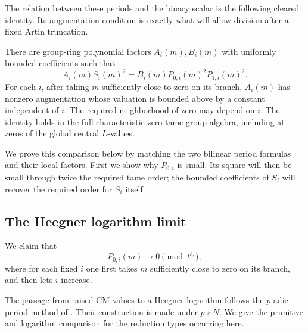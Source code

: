 The relation between these periods and the binary scalar is the
following cleared identity.  Its augmentation condition is exactly
what will allow division after a fixed Artin truncation.

\begin{lemma}
\label{lem:cleared-period-comparison}
There are group-ring polynomial factors $A_i(m),B_i(m)$ with uniformly
bounded coefficients such that
\begin{equation}\label{eq:cleared-period-comparison}
 A_i(m)S_i(m)^2
   =B_i(m)P_{0,i}(m)^2P_{1,i}(m)^2.
\end{equation}
For each $i$, after taking $m$ sufficiently close to zero on its branch,
$A_i(m)$ has nonzero augmentation whose valuation is bounded above by
a constant independent of $i$.  The required neighborhood of zero may
depend on $i$.
The identity holds in the full characteristic-zero tame group algebra,
including at zeros of the global central $L$-values.
\end{lemma}

We prove this comparison below by matching the two bilinear period
formulas and their local factors.  First we show why $P_{0,i}$ is small.
Its square will then be small through twice the required tame order;
the bounded coefficients of $S_i$ will recover the required order for
$S_i$ itself.

\subsection{The Heegner logarithm limit}

We claim that
\begin{equation}\label{eq:toric-period-small}
 P_{0,i}(m)\longrightarrow0\pmod {t^{b_*}},
\end{equation}
where for each fixed $i$ one first takes $m$ sufficiently close to zero
on its branch, and then lets $i$ increase.

The passage from raised CM values to a Heegner logarithm follows the
$p$-adic period method of
\citet[Introduction and Proposition~3.24]{BertoliniDarmonPrasanna2013}.
Their construction is made under $p\nmid N$.  We give the primitive
and logarithm comparison for the reduction types occurring here.

